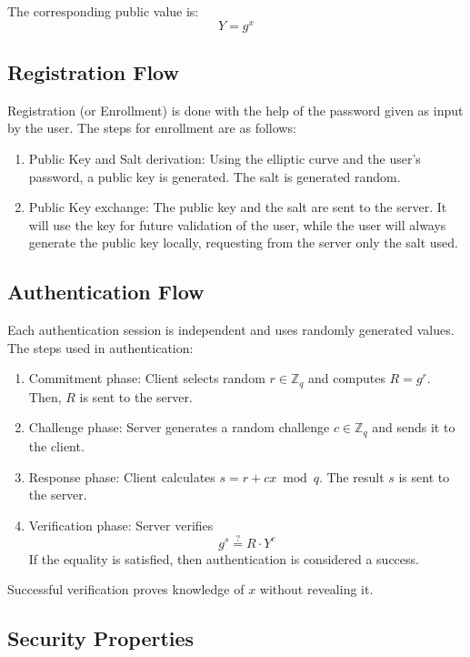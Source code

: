 \documentclass[conference]{IEEEtran}
\begin{document}
The corresponding public value is:
\begin{equation}
Y = g^x
\end{equation}

\subsection{Registration Flow}
Registration (or Enrollment) is done with the help of the password given as input by the user. The steps for enrollment are as follows:
\begin{enumerate}
    \item Public Key and Salt derivation: Using the elliptic curve and the user's password, a public key is generated. The salt is generated random.
    \item Public Key exchange: The public key and the salt are sent to the server. It will use the key for future validation of the user, while the user will always generate the public key locally, requesting from the server only the salt used.
\end{enumerate}

\subsection{Authentication Flow}
Each authentication session is independent and uses randomly generated values.
The steps used in authentication:
\begin{enumerate}
    \item Commitment phase: Client selects random $r \in \mathbb{Z}_q$ and computes $R = g^r$. Then, $R$ is sent to the server.
    \item Challenge phase: Server generates a random challenge $c \in \mathbb{Z}_q$ and sends it to the client.
    \item Response phase: Client calculates $s = r + cx \bmod q$. The result $s$ is sent to the server.
    \item Verification phase: Server verifies
    \begin{equation}
        g^s \stackrel{?}{=} R \cdot Y^c
    \end{equation}
    If the equality is satisfied, then authentication is considered a success.
\end{enumerate}

Successful verification proves knowledge of $x$ without revealing it.

\subsection{Security Properties}
\end{document}
